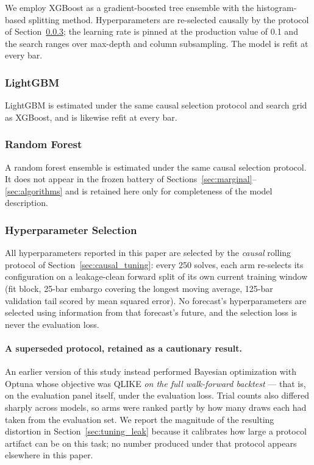 We employ XGBoost \citep{Chen2016} as a gradient-boosted tree ensemble with the histogram-based splitting method. Hyperparameters are re-selected causally by the protocol of Section~\ref{sec:tuning}; the learning rate is pinned at the production value of 0.1 and the search ranges over max-depth and column subsampling. The model is refit at every bar.

\subsubsection{LightGBM}
\label{sec:lightgbm}

LightGBM \citep{Ke2017} is estimated under the same causal selection protocol and search grid as XGBoost, and is likewise refit at every bar.

\subsubsection{Random Forest}
\label{sec:rf}

A random forest ensemble is estimated under the same causal selection protocol. It does not appear in the frozen battery of Sections~\ref{sec:marginal}--\ref{sec:algorithms} and is retained here only for completeness of the model description.

\subsubsection{Hyperparameter Selection}
\label{sec:tuning}

All hyperparameters reported in this paper are selected by the \emph{causal}
rolling protocol of Section~\ref{sec:causal_tuning}: every 250 solves, each arm
re-selects its configuration on a leakage-clean forward split of its own
current training window (fit block, 25-bar embargo covering the longest moving
average, 125-bar validation tail scored by mean squared error). No forecast's
hyperparameters are selected using information from that forecast's future, and
the selection loss is never the evaluation loss.

\paragraph{A superseded protocol, retained as a cautionary result.}
An earlier version of this study instead performed Bayesian optimization with
Optuna \citep{Akiba2019} whose objective was QLIKE \emph{on the full
walk-forward backtest} --- that is, on the evaluation panel itself, under the
evaluation loss. Trial counts also differed sharply across models, so arms were
ranked partly by how many draws each had taken from the evaluation set. We
report the magnitude of the resulting distortion in
Section~\ref{sec:tuning_leak} because it calibrates how large a protocol
artifact can be on this task; no number produced under that protocol appears
elsewhere in this paper.

